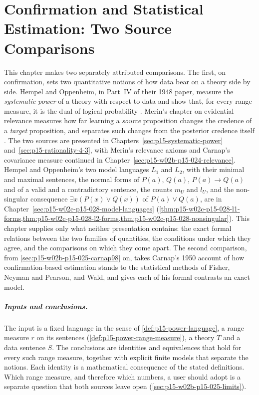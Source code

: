 \chapter{Confirmation and Statistical Estimation: Two Source Comparisons}
\label{sec:p15-w02b-p15-025-comparison}

This chapter makes two separately attributed comparisons. The first,
on confirmation, sets two quantitative notions of how data bear on a
theory side by side. Hempel and Oppenheim, in Part~IV of their 1948
paper, measure the \emph{systematic power} of a theory with respect to
data and show that, for every range measure, it is the dual of logical
probability \cite[pp.~164--173]{HempelOppenheim1948Explanation}.
Merin's chapter on evidential relevance measures how far learning a
\emph{source} proposition changes the credence of a \emph{target}
proposition, and separates such changes from the posterior credence
itself \cite[pp.~265--275]{Merin2021Relevance}. The two sources are
presented in Chapters~\ref{sec:p15-systematic-power}
and~\ref{sec:p15-rationality-4-3}, with Merin's relevance axioms and
Carnap's covariance measure continued in
Chapter~\ref{sec:p15-w02b-p15-024-relevance}. Hempel and Oppenheim's two
model languages \(L_1\) and \(L_2\), with their minimal and maximal
sentences, the normal forms of \(P(a)\), \(Q(a)\), \(P(a)\to Q(a)\) and
of a valid and a contradictory sentence, the counts \(m_U\) and \(l_U\),
and the non-singular consequence \(\exists x(P(x)\lor Q(x))\) of
\(P(a)\lor Q(a)\), are in Chapter~\ref{sec:p15-w02c-p15-028-model-languages}
(\cref{thm:p15-w02c-p15-028-l1-forms,thm:p15-w02c-p15-028-l2-forms,thm:p15-w02c-p15-028-nonsingular}).
This chapter supplies only
what neither presentation contains: the exact formal relations between
the two families of quantities, the conditions under which they agree,
and the comparisons on which they come apart. The second comparison,
from \cref{sec:p15-w02b-p15-025-carnap98} on, takes Carnap's 1950
account of how confirmation-based estimation stands to the statistical
methods of Fisher, Neyman and Pearson, and Wald, and gives each of his
formal contrasts an exact model.

\paragraph{Inputs and conclusions.}
The input is a fixed language in the sense of
\cref{def:p15-power-language}, a range measure \(r\) on its sentences
(\cref{def:p15-power-range-measure}), a theory \(T\) and a data sentence
\(S\). The conclusions are identities and equivalences that hold for
every such range measure, together with explicit finite models that
separate the notions. Each identity is a mathematical consequence of the
stated definitions. Which range measure, and therefore which numbers, a
user should adopt is a separate question that both sources leave open
(\cref{sec:p15-w02b-p15-025-limits}).

